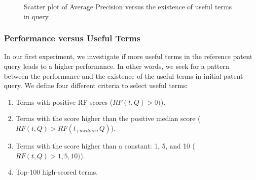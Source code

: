 \begin{figure}[t!]
\begin{centering}
 \hspace*{1.5cm} 
\par\end{centering}

\protect\caption{Scatter plot of Average Precision versus the existence of useful terms in query.}
\label{fig:overlap-p}
\end{figure}
\subsubsection{Performance versus Useful Terms}
\label{PerformanceUsefulTerms}
In our first experiment, we investigate if more useful terms in the reference patent query leads to a higher performance. In other words, we seek for a pattern between the performance and the existence of the useful terms in initial patent query. We define four different criteria to select useful terms:
\begin{enumerate}
\item Terms with positive RF scores ($ RF(t, Q)>0) $).
\item Terms with the score higher than the positive median score ($ RF(t, Q)>RF(t_{+median}, Q) $).
\item Terms with the score higher than a constant: 1, 5, and 10 ($ RF(t, Q)>1, 5, 10) $).
\item Top-100 high-scored terms.
\end{enumerate}

